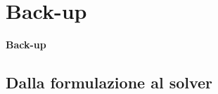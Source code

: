 \documentclass[handout]{beamer}%
\begin{document}
\section{Back-up}

\begin{frame}%

\vfill
\begin{center}
{\Huge\bfseries Back-up}
\end{center}
\vfill

\transboxout%
\end{frame}%


\subsection{Dalla formulazione al solver}%
\end{document}
